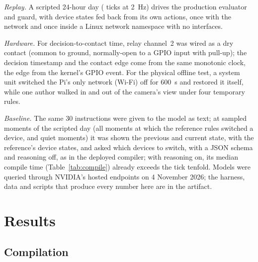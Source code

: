 \documentclass[conference]{IEEEtran}
\begin{document}
\textit{Replay.} A scripted 24-hour day (\replayTicks{} ticks at 2~Hz) drives
the production evaluator and guard, with device states fed back from its own
actions, once with the network and once inside a Linux network namespace with
no interfaces.

\textit{Hardware.} For decision-to-contact time, relay channel~2 was wired as a
dry contact (common to ground, normally-open to a GPIO input with pull-up);
the decision timestamp and the contact edge come from the same monotonic clock,
the edge from the kernel's GPIO event. For the physical offline test, a system
unit switched the Pi's only network (Wi-Fi) off for 600~s and restored it
itself, while one author walked in and out of the camera's view under four
temporary rules.

\textit{Baseline.} The same 30 instructions were given to the model as text;
at \blN{} sampled moments of the scripted day (all \blEdges{} moments at which
the reference rules switched a device, and quiet moments) it was shown the
previous and current state, with the reference's device states, and asked
which devices to switch, with a JSON
schema and reasoning off, as in the deployed compiler; with reasoning on, its
median compile time (Table~\ref{tab:compile}) already exceeds the tick
tenfold. Models were queried
through NVIDIA's hosted endpoints on 4 November 2026; the harness, data and
scripts that produce every number here are in the artifact.

\section{Results}\label{sec:results}

\subsection{Compilation}\label{sec:compile}
\end{document}
